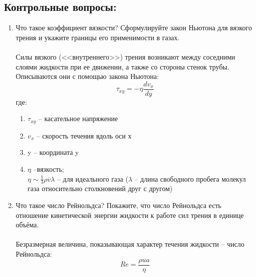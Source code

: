 \documentclass[a4paper,12pt]{article}
\begin{document}
\subsection{Контрольные вопросы:}
\begin{enumerate}
\itemsep0em
\item Что такое коэффициент вязкости? Сформулируйте закон Ньютона для вязкого трения и укажите границы его применимости в газах. \\\\ 
Силы вязкого (<<внутреннего>>) трения возникают между соседними слоями жидкости при ее движении, а также со стороны стенок трубы. Описываются они с помощью закона Ньютона:
\begin{equation}
\tau_{xy} = -\eta \frac{dv_{x}}{dy}
\end{equation}
где:
\begin{enumerate}
\itemsep0em
\item $\tau_{xy}$ -- касательное напряжение
\item $v_{x}$ -- скорость течения вдоль оси х
\item y -- координата y  
\item $\eta$ --вязкость; \\
$\eta \sim \frac{1}{3}\rho \overline{v} \lambda$ -- для идеального газа ($\lambda$ -- длина свободного пробега молекул газа относительно столкновений друг с другом)
\end{enumerate}
\item Что такое число Рейнольдса? Покажите, что число Рейнольдса есть отношение кинетической энергии жидкости к работе сил трения в единице объёма.\\\\
Безразмерная величина, показывающая характер течения жидкости -- число Рейнольдса:
\[
Re = \frac{\rho ua}{\eta}
\]


\end{enumerate}
\end{document}
